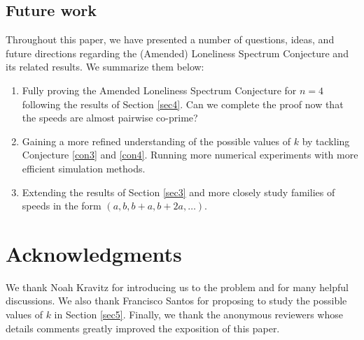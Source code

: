 \documentclass[11pt]{amsart}
\begin{document}
\subsection{Future work}
\par Throughout this paper, we have presented a number of questions, ideas, and future directions regarding the (Amended) Loneliness Spectrum Conjecture and its related results. We summarize them below:
\begin{enumerate}
    \item Fully proving the Amended Loneliness Spectrum Conjecture for $n = 4$ following the results of Section \ref{sec4}. Can we complete the proof now that the speeds are almost pairwise co-prime?
    \item Gaining a more refined understanding of the possible values of $k$ by tackling Conjecture \ref{con3} and \ref{con4}. Running more numerical experiments with more efficient simulation methods.
    \item Extending the results of Section \ref{sec3} and more closely study families of speeds in the form $(a,b,b + a,b + 2a,\ldots)$.
\end{enumerate}

\section*{Acknowledgments}

We thank Noah Kravitz for introducing us to the problem and for many helpful discussions. We also thank Francisco Santos for proposing to study the possible values of $k$ in Section \ref{sec5}. Finally, we thank the anonymous reviewers whose details comments greatly improved the exposition of this paper.







\end{document}
